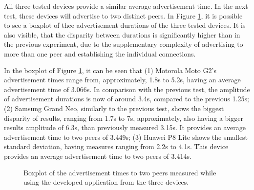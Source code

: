 All three tested devices provide a similar average advertisement time. In the next test, these devices will advertise to two distinct peers. In Figure \ref{fig:adv2}, it is possible to see a boxplot of thee advertisement durations of the three tested devices. It is also visible, that the disparity between durations is significantly higher than in the previous experiment, due to the supplementary complexity of advertising to more than one peer and establishing the individual connections.

In the boxplot of Figure \ref{fig:adv2}, it can be seen that (1) Motorola Moto G2's advertisement times range from, approximately, 1.8s to 5.2s, having an average advertisement time of 3.066s. In comparison with the previous test, the amplitude of advertisement durations is now of around 3.4s, compared to the previous 1.25s; (2) Samsung Grand Neo, similarly to the previous test, shows the biggest disparity of results, ranging from 1.7s to 7s, approximately, also having a bigger results amplitude of 6.3s, than previously measured 3.15s. It provides an average advertisement time to two peers of 3.449s; (3) Huawei P8 Lite shows the smallest standard deviation, having measures ranging from 2.2s to 4.1s. This device provides an average advertisement time to two peers of 3.414s.

\begin{figure}[ht]
	\noindent{}
	\caption{\label{fig:adv2} Boxplot of the advertisement times to two peers measured while using the developed application from the three devices.}
\end{figure}

